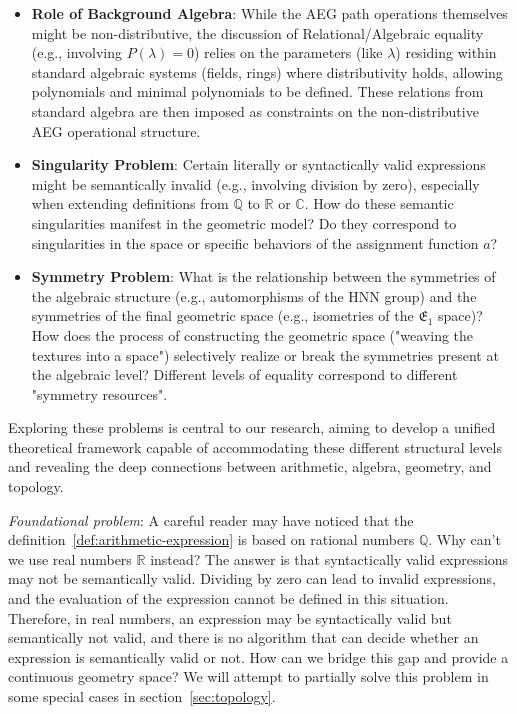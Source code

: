 \begin{itemize}
    \item \textbf{Role of Background Algebra}: While the AEG path operations themselves might be non-distributive, the discussion of Relational/Algebraic equality (e.g., involving $P(\lambda)=0$) relies on the parameters (like $\lambda$) residing within standard algebraic systems (fields, rings) where distributivity holds, allowing polynomials and minimal polynomials to be defined. These relations from standard algebra are then imposed as constraints on the non-distributive AEG operational structure.
    \item \textbf{Singularity Problem}: Certain literally or syntactically valid expressions might be semantically invalid (e.g., involving division by zero), especially when extending definitions from $\mathbb{Q}$ to $\mathbb{R}$ or $\mathbb{C}$. How do these semantic singularities manifest in the geometric model? Do they correspond to singularities in the space or specific behaviors of the assignment function $a$?
    \item \textbf{Symmetry Problem}: What is the relationship between the symmetries of the algebraic structure (e.g., automorphisms of the HNN group) and the symmetries of the final geometric space (e.g., isometries of the $\mathfrak{E}_1$ space)? How does the process of constructing the geometric space ("weaving the textures into a space") selectively realize or break the symmetries present at the algebraic level? Different levels of equality correspond to different "symmetry resources".
\end{itemize}

Exploring these problems is central to our research, aiming to develop a unified theoretical framework capable of accommodating these different structural levels and revealing the deep connections between arithmetic, algebra, geometry, and topology.

\emph{Foundational problem}: A careful reader may have noticed that the definition~\ref{def:arithmetic-expression} is based on rational numbers $\mathbb{Q}$.
Why can't we use real numbers $\mathbb{R}$ instead?
The answer is that syntactically valid expressions may not be semantically valid.
Dividing by zero can lead to invalid expressions, and the evaluation of the expression cannot be defined in this situation.
Therefore, in real numbers, an expression may be syntactically valid but semantically not valid,
and there is no algorithm that can decide whether an expression is semantically valid or not.
How can we bridge this gap and provide a continuous geometry space?
We will attempt to partially solve this problem in some special cases in section~\ref{sec:topology}.

